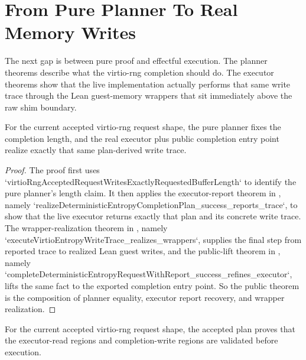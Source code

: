 \section{From Pure Planner To Real Memory Writes}

The next gap is between pure proof and effectful execution.
The planner theorems describe what the virtio-rng completion should do.
The executor theorems show that the live implementation actually performs that same write trace through the Lean guest-memory wrappers that sit immediately above the raw shim boundary.

\begin{theorem}
\label{thm:executor-trace}
\leanok
For the current accepted virtio-rng request shape, the pure planner fixes the completion length, and the real executor plus public completion entry point realize exactly that same plan-derived write trace.
\end{theorem}

\begin{proof}
\leanok
{}
The proof first uses `virtioRngAcceptedRequestWritesExactlyRequestedBufferLength` to identify the pure planner's length claim.
It then applies the executor-report theorem in , namely `realizeDeterministicEntropyCompletionPlan_success_reports_trace`, to show that the live executor returns exactly that plan and its concrete write trace.
The wrapper-realization theorem in , namely `executeVirtioEntropyWriteTrace_realizes_wrappers`, supplies the final step from reported trace to realized Lean guest writes, and the public-lift theorem in , namely `completeDeterministicEntropyRequestWithReport_success_refines_executor`, lifts the same fact to the exported completion entry point.
So the public theorem is the composition of planner equality, executor report recovery, and wrapper realization.
\end{proof}

\begin{theorem}
\label{thm:validated-accesses}
\leanok
For the current accepted virtio-rng request shape, the accepted plan proves that the executor-read regions and completion-write regions are validated before execution.
\end{theorem}

